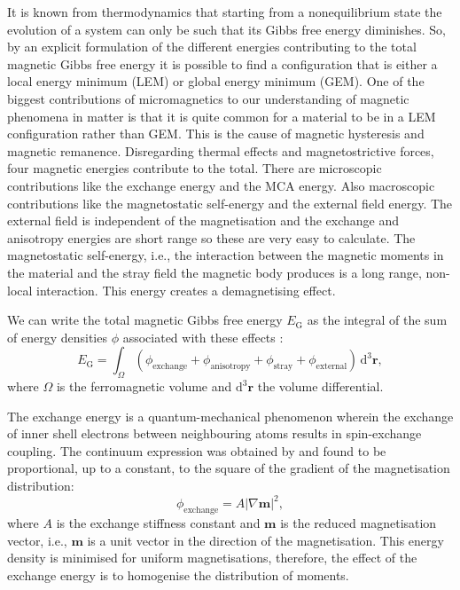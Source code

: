 It is known from thermodynamics that starting from a nonequilibrium state the evolution of a system can only be such that its Gibbs free energy diminishes. So, by an explicit formulation of the different energies contributing to the total magnetic Gibbs free energy it is possible to find a configuration that is either a local energy minimum (LEM) or global energy minimum (GEM). One of the biggest contributions of micromagnetics to our understanding of magnetic phenomena in matter is that it is quite common for a material to be in a LEM configuration rather than GEM. This is the cause of magnetic hysteresis and magnetic remanence. Disregarding thermal effects and magnetostrictive forces, four magnetic energies contribute to the total. There are microscopic contributions like the exchange energy and the MCA energy. Also macroscopic contributions like the magnetostatic self-energy and the external field energy. The external field is independent of the magnetisation and the exchange and anisotropy energies are short range so these are very easy to calculate. The magnetostatic self-energy, i.e., the interaction between the magnetic moments in the material and the stray field the magnetic body produces is a long range, non-local interaction. This energy creates a demagnetising effect.\par

We can write the total magnetic Gibbs free energy $E_\text{G}$ as the integral of the sum of energy densities $\phi$ associated with these effects \citep{Brown}:
\begin{equation}\label{gibbs0}
E_{\text{G}} = \int_{\Omega} (\phi_{\text{exchange}} + \phi_{\text{anisotropy}} + \phi_{\text{stray}} + \phi_{\text{external}})\, \text{d}^3\boldsymbol{r},
\end{equation}
where $\Omega$ is the ferromagnetic volume and $\text{d}^3\boldsymbol{r}$ the volume differential.\par

The exchange energy is a quantum-mechanical phenomenon wherein the exchange of inner shell electrons between neighbouring atoms results in spin-exchange coupling. The continuum expression was obtained by \citet{Landau1935} and found to be proportional, up to a constant, to the square of the gradient of the magnetisation distribution:
\begin{equation}
\phi_{\text{exchange}} = A | \nabla \boldsymbol{m} |^2,
\end{equation}
where $A$ is the exchange stiffness constant and $\boldsymbol{m}$ is the reduced magnetisation vector, i.e., $\boldsymbol{m}$ is a unit vector in the direction of the magnetisation. This energy density is minimised for uniform magnetisations, therefore, the effect of the exchange energy is to homogenise the distribution of moments.\par


